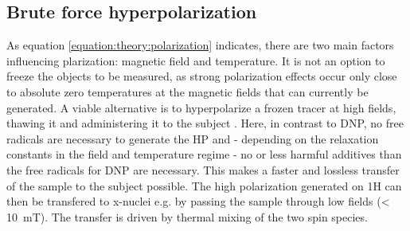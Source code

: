         \subsection{Brute force hyperpolarization}
        As equation \ref{equation:theory:polarization} indicates, there are two main factors influencing plarization: magnetic field and temperature. It is not an option to freeze the objects to be measured, as strong polarization effects occur only close to absolute zero temperatures at the magnetic fields that can currently be generated. A viable alternative is to hyperpolarize a frozen tracer at high fields, thawing it and administering it to the subject \cite{hirsch_brute-force_2015}. Here, in contrast to DNP, no free radicals are necessary to generate the HP and - depending on the relaxation constants in the field and temperature regime - no or less harmful additives than the free radicals for DNP are necessary. This makes a faster and lossless transfer of the sample to the subject possible. The high polarization generated on 1H can then be transfered to x-nuclei e.g. by passing the sample through low fields (< \SI{10}{\milli\tesla}). The transfer is driven by thermal mixing \cite{goldman_overview_2008} of the two spin species.
